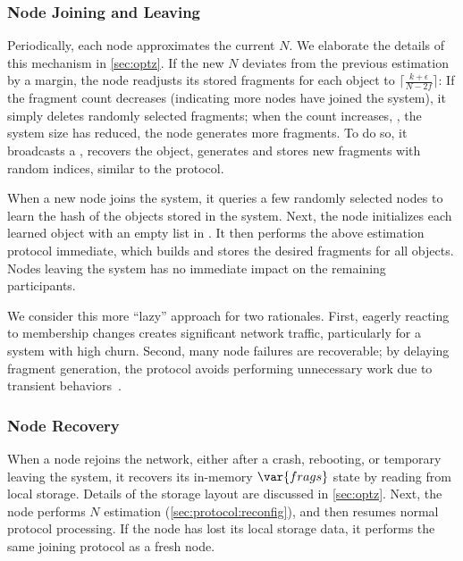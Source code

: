 \subsubsection{Node Joining and Leaving}
\label{sec:protocol:reconfig}

Periodically, each node approximates the current $N$.
We elaborate the details of this mechanism in \autoref{sec:optz}.
If the new $N$ deviates from the previous estimation by a margin, the node readjusts its stored fragments for each object to $\lceil\frac{k + \epsilon}{N - 2f}\rceil$:
If the fragment count decreases (indicating more nodes have joined the system), it simply deletes randomly selected fragments;
when the count increases, \ie, the system size has reduced, the node generates more fragments.
To do so, it broadcasts a , recovers the object, generates and stores new fragments with random indices, similar to the  protocol.

When a new node joins the system, it queries a few randomly selected nodes to learn the hash of the objects stored in the system.
Next, the node initializes each learned object with an empty list in .
It then performs the above estimation protocol immediate, which builds and stores the desired fragments for all objects.
Nodes leaving the system has no immediate impact on the remaining participants.

We consider this more ``lazy'' approach for two rationales.
First, eagerly reacting to membership changes creates significant network traffic, particularly for a system with high churn.
Second, many node failures are recoverable;
by delaying fragment generation, the protocol avoids performing unnecessary work due to transient behaviors~\cite{carbonite}.

\subsubsection{Node Recovery}

When a node rejoins the network, either after a crash, rebooting, or temporary leaving the system, it recovers its in-memory $\var{frags}$ state by reading from local storage.
Details of the storage layout are discussed in \autoref{sec:optz}.
Next, the node performs $N$ estimation (\autoref{sec:protocol:reconfig}), and then resumes normal protocol processing.
If the node has lost its local storage data, it performs the same joining protocol as a fresh node.

